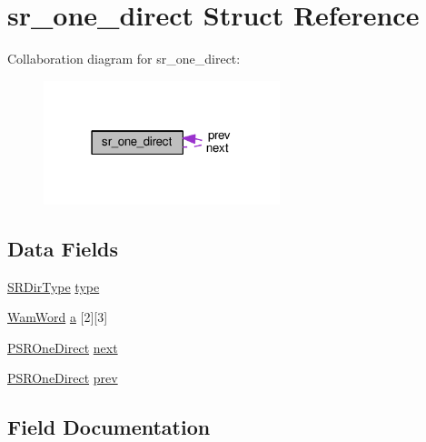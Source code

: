 \hypertarget{structsr__one__direct}{}\section{sr\+\_\+one\+\_\+direct Struct Reference}
\label{structsr__one__direct}


Collaboration diagram for sr\+\_\+one\+\_\+direct\+:\nopagebreak
\begin{figure}[H]
\begin{center}
\leavevmode
\includegraphics[width=195pt]{structsr__one__direct__coll__graph}
\end{center}
\end{figure}
\subsection*{Data Fields}
\begin{DoxyCompactItemize}
\item 
\hyperlink{src__rdr__c_8c_a03d2b46a29dc63fb6b0a6ec9378f36af}{S\+R\+Dir\+Type} \hyperlink{structsr__one__direct_ac59da886bfa2db8f18de3506965397f7}{type}
\item 
\hyperlink{LINUX__SIGSEGV_8c_a10ea8be8823feb38875b8a9326cbb424}{Wam\+Word} \hyperlink{structsr__one__direct_abe60646d574e029facc37a9b2491a74b}{a} \mbox{[}2\mbox{]}\mbox{[}3\mbox{]}
\item 
\hyperlink{src__rdr__c_8c_ad9901c46d3661cb327d1a08a1131e06a}{P\+S\+R\+One\+Direct} \hyperlink{structsr__one__direct_a601890e68d977d3467e52ab3a7ce9703}{next}
\item 
\hyperlink{src__rdr__c_8c_ad9901c46d3661cb327d1a08a1131e06a}{P\+S\+R\+One\+Direct} \hyperlink{structsr__one__direct_a25fd2e3df4af8e0f8cb89af0a1ea77f9}{prev}
\end{DoxyCompactItemize}


\subsection{Field Documentation}

